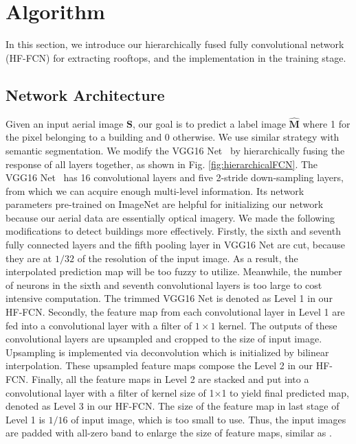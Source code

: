 
\section{Algorithm} 
\label{section:systemoverview}
   
   In this section, we introduce our hierarchically fused fully convolutional network (HF-FCN) for extracting rooftops, and the implementation in the training stage.
    
    
\subsection{Network Architecture}  
  Given an input aerial image $\mathbf{S}$, our goal is to predict a label image $\mathbf{\hat{M}}$ where 1 for the pixel belonging to a building and 0 otherwise. We use similar strategy with semantic segmentation. 
  We modify the VGG16 Net~\cite{Simonyan2015Very} by hierarchically fusing the response of all layers together, as shown in Fig. \ref{fig:hierarchicalFCN}. 
  The VGG16 Net~\cite{Simonyan2015Very} has 16 convolutional layers and five 2-stride down-sampling layers, from which we can acquire enough multi-level information. Its network parameters pre-trained on ImageNet are helpful for initializing our network  because our aerial data are essentially optical imagery. 
  We made the following modifications to detect buildings more effectively. 
  Firstly, the sixth and seventh fully connected layers and the fifth pooling layer in VGG16 Net are cut, because they are at $1/32$ of the resolution of the input image. 
  As a result, the interpolated prediction map will be too fuzzy to utilize. Meanwhile, the number of neurons in the sixth and seventh convolutional layers is too large to cost intensive computation. 
  The trimmed VGG16 Net is denoted as Level 1 in our HF-FCN.
  Secondly, the feature map from each convolutional layer in Level 1 are fed into a convolutional layer with a filter of $1\times1$ kernel. The outputs of these convolutional layers are upsampled and cropped to the size of input image. 
  Upsampling is implemented via deconvolution which is initialized by bilinear interpolation.  
  These upsampled feature maps compose the Level 2 in our HF-FCN. 
  Finally, all the feature maps in Level 2 are stacked and put into a convolutional layer with a filter of kernel size of 1$\times$1  to yield final predicted map, denoted as Level 3 in our HF-FCN. 
  The size of the feature map in last stage of Level 1 is $1/16$ of input image, which is too small to use. 
  Thus, the input images are padded with all-zero band to enlarge the size of feature maps, similar as  \cite{Long2014Fully}. 
 
